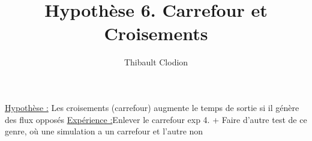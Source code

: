 \documentclass[12pt]{article}
\title{Hypothèse 6. Carrefour et Croisements}
\author{Thibault Clodion}
\begin{document}
\maketitle %

\underline{Hypothèse :} Les croisements (carrefour) augmente le temps de sortie si il génère des flux opposés
\newline\newline
\underline{Expérience :}Enlever le carrefour exp 4. + Faire d'autre test de ce genre, où une simulation a un carrefour et l'autre non
\newline\newline
\end{document}
